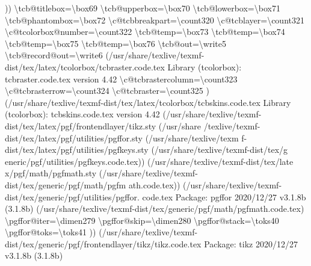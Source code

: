 \documentclass[
  letterpaper,
  DIV=11,
  numbers=noendperiod]{scrartcl}
\newenvironment{Shaded}{\begin{snugshade}}{\end{snugshade}}
\newcommand{\NormalTok}[1]{\textcolor[rgb]{0.00,0.23,0.31}{#1}}
\begin{document}
\begin{Shaded}
\begin{Highlighting}[]
\NormalTok{))}
\NormalTok{\textbackslash{}tcb@titlebox=\textbackslash{}box69}
\NormalTok{\textbackslash{}tcb@upperbox=\textbackslash{}box70}
\NormalTok{\textbackslash{}tcb@lowerbox=\textbackslash{}box71}
\NormalTok{\textbackslash{}tcb@phantombox=\textbackslash{}box72}
\NormalTok{\textbackslash{}c@tcbbreakpart=\textbackslash{}count320}
\NormalTok{\textbackslash{}c@tcblayer=\textbackslash{}count321}
\NormalTok{\textbackslash{}c@tcolorbox@number=\textbackslash{}count322}
\NormalTok{\textbackslash{}tcb@temp=\textbackslash{}box73}
\NormalTok{\textbackslash{}tcb@temp=\textbackslash{}box74}
\NormalTok{\textbackslash{}tcb@temp=\textbackslash{}box75}
\NormalTok{\textbackslash{}tcb@temp=\textbackslash{}box76}
\NormalTok{\textbackslash{}tcb@out=\textbackslash{}write5}
\NormalTok{\textbackslash{}tcb@record@out=\textbackslash{}write6}
\NormalTok{(/usr/share/texlive/texmf{-}dist/tex/latex/tcolorbox/tcbraster.code.tex}
\NormalTok{Library (tcolorbox): \textquotesingle{}tcbraster.code.tex\textquotesingle{} version \textquotesingle{}4.42\textquotesingle{}}
\NormalTok{\textbackslash{}c@tcbrastercolumn=\textbackslash{}count323}
\NormalTok{\textbackslash{}c@tcbrasterrow=\textbackslash{}count324}
\NormalTok{\textbackslash{}c@tcbraster=\textbackslash{}count325}
\NormalTok{) (/usr/share/texlive/texmf{-}dist/tex/latex/tcolorbox/tcbskins.code.tex}
\NormalTok{Library (tcolorbox): \textquotesingle{}tcbskins.code.tex\textquotesingle{} version \textquotesingle{}4.42\textquotesingle{}}
\NormalTok{(/usr/share/texlive/texmf{-}dist/tex/latex/pgf/frontendlayer/tikz.sty (/usr/share}
\NormalTok{/texlive/texmf{-}dist/tex/latex/pgf/utilities/pgffor.sty (/usr/share/texlive/texm}
\NormalTok{f{-}dist/tex/latex/pgf/utilities/pgfkeys.sty (/usr/share/texlive/texmf{-}dist/tex/g}
\NormalTok{eneric/pgf/utilities/pgfkeys.code.tex)) (/usr/share/texlive/texmf{-}dist/tex/late}
\NormalTok{x/pgf/math/pgfmath.sty (/usr/share/texlive/texmf{-}dist/tex/generic/pgf/math/pgfm}
\NormalTok{ath.code.tex)) (/usr/share/texlive/texmf{-}dist/tex/generic/pgf/utilities/pgffor.}
\NormalTok{code.tex}
\NormalTok{Package: pgffor 2020/12/27 v3.1.8b (3.1.8b)}
\NormalTok{(/usr/share/texlive/texmf{-}dist/tex/generic/pgf/math/pgfmath.code.tex)}
\NormalTok{\textbackslash{}pgffor@iter=\textbackslash{}dimen279}
\NormalTok{\textbackslash{}pgffor@skip=\textbackslash{}dimen280}
\NormalTok{\textbackslash{}pgffor@stack=\textbackslash{}toks40}
\NormalTok{\textbackslash{}pgffor@toks=\textbackslash{}toks41}
\NormalTok{))}
\NormalTok{(/usr/share/texlive/texmf{-}dist/tex/generic/pgf/frontendlayer/tikz/tikz.code.tex}
\NormalTok{Package: tikz 2020/12/27 v3.1.8b (3.1.8b)}


\end{Highlighting}
\end{Shaded}
\end{document}
